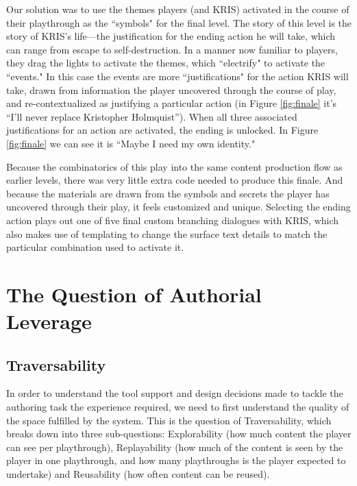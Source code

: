 
Our solution was to use the themes players (and KRIS) activated in the course of their playthrough as the ``symbols" for the final level. The story of this level is the story of KRIS's life---the justification for the ending action he will take, which can range from escape to self-destruction. In a manner now familiar to players, they drag the lights to activate the themes, which ``electrify" to activate the ``events." In this case the events are more ``justifications" for the action KRIS will take, drawn from information the player uncovered through the course of play, and re-contextualized as justifying a particular action (in Figure \ref{fig:finale} it's ``I'll never replace Kristopher Holmquist”). When all three associated justifications for an action are activated, the ending is unlocked. In Figure \ref{fig:finale} we can see it is ``Maybe I need my own identity."

Because the combinatorics of this play into the same content production flow as earlier levels, there was very little extra code needed to produce this finale. And because the materials are drawn from the symbols and secrets the player has uncovered through their play, it feels customized and unique. Selecting the ending action plays out one of five final custom branching dialogues with KRIS, which also makes use of templating to change the surface text details to match the particular combination used to activate it.

\section{The Question of Authorial Leverage}\label{sec:the-question-of-authorial-leverage}

\subsection{Traversability}\label{subsec:icebound-traversability}
In order to understand the tool support and design decisions made to tackle the authoring task the experience required, we need to first understand the quality of the space fulfilled by the system. This is the question of Traversability, which breaks down into three sub-questions: Explorability (how much content the player can see per playthrough), Replayability (how much of the content is seen by the player in one playthrough, and how many playthroughs is the player expected to undertake) and Reusability (how often content can be reused).

